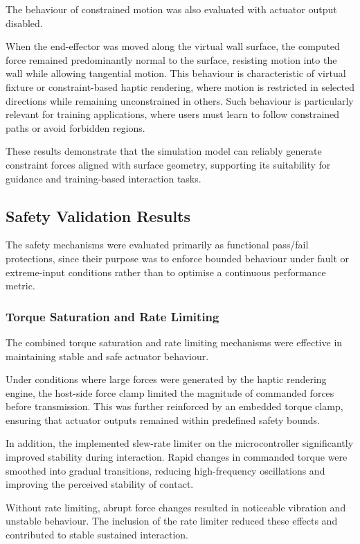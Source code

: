 The behaviour of constrained motion was also evaluated with actuator output disabled.

When the end-effector was moved along the virtual wall surface, the computed force remained predominantly normal to the surface, resisting motion into the wall while allowing tangential motion. This behaviour is characteristic of virtual fixture or constraint-based haptic rendering, where motion is restricted in selected directions while remaining unconstrained in others. Such behaviour is particularly relevant for training applications, where users must learn to follow constrained paths or avoid forbidden regions.

These results demonstrate that the simulation model can reliably generate constraint forces aligned with surface geometry, supporting its suitability for guidance and training-based interaction tasks.

\subsection{Safety Validation Results}
The safety mechanisms were evaluated primarily as functional pass/fail protections, since their purpose was to enforce bounded behaviour under fault or extreme-input conditions rather than to optimise a continuous performance metric.
\subsubsection{Torque Saturation and Rate Limiting}
The combined torque saturation and rate limiting mechanisms were effective in maintaining stable and safe actuator behaviour.

Under conditions where large forces were generated by the haptic rendering engine, the host-side force clamp limited the magnitude of commanded forces before transmission. This was further reinforced by an embedded torque clamp, ensuring that actuator outputs remained within predefined safety bounds.

In addition, the implemented slew-rate limiter on the microcontroller significantly improved stability during interaction. Rapid changes in commanded torque were smoothed into gradual transitions, reducing high-frequency oscillations and improving the perceived stability of contact.

Without rate limiting, abrupt force changes resulted in noticeable vibration and unstable behaviour. The inclusion of the rate limiter reduced these effects and contributed to stable sustained interaction.

